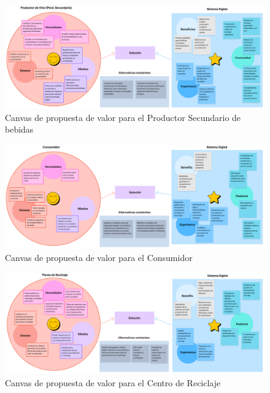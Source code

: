 \begin{figure}[!htb]
    \centering
    \includegraphics[width=\textwidth]{Figures/value-proposition-canvas-secondary-producer.png}
    \caption{Canvas de propuesta de valor para el Productor Secundario de bebidas}
    \label{fig:value-proposition-canvas-secondary-producer}
\end{figure}

\begin{figure}[!htb]
    \centering
    \includegraphics[width=\textwidth]{Figures/value-proposition-canvas-consumer.png}
    \caption{Canvas de propuesta de valor para el Consumidor}
    \label{fig:value-proposition-canvas-consumer}
\end{figure}

\begin{figure}[!htb]
    \centering
    \includegraphics[width=\textwidth]{Figures/value-proposition-canvas-recycler.png}
    \caption{Canvas de propuesta de valor para el Centro de Reciclaje}
    \label{fig:value-proposition-canvas-recycler}
\end{figure}

